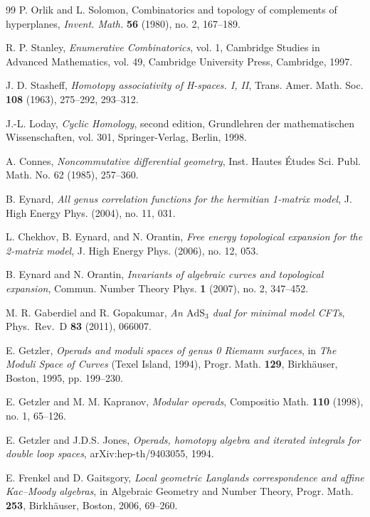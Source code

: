 \begin{thebibliography}{99}
 P. Orlik and L. Solomon, Combinatorics and topology of complements of hyperplanes, \emph{Invent. Math.} \textbf{56} (1980), no. 2, 167--189.
 
 R. P. Stanley, \emph{Enumerative Combinatorics}, vol. 1, Cambridge Studies in Advanced Mathematics, vol. 49, Cambridge University Press, Cambridge, 1997.

 J. D. Stasheff, \emph{Homotopy associativity of H-spaces. I, II}, Trans. Amer. Math. Soc. \textbf{108} (1963), 275--292, 293--312.

J.-L. Loday, \emph{Cyclic Homology}, second edition, Grundlehren der mathematischen Wissenschaften, vol. 301, Springer-Verlag, Berlin, 1998.

A. Connes, \emph{Noncommutative differential geometry}, Inst. Hautes \'Etudes Sci. Publ. Math. No. 62 (1985), 257--360.

 B. Eynard, \emph{All genus correlation functions for the hermitian 1-matrix model}, J. High Energy Phys. (2004), no. 11, 031.

 L. Chekhov, B. Eynard, and N. Orantin, \emph{Free energy topological expansion for the 2-matrix model}, J. High Energy Phys. (2006), no. 12, 053.

 B. Eynard and N. Orantin, \emph{Invariants of algebraic curves and topological expansion}, Commun. Number Theory Phys. \textbf{1} (2007), no. 2, 347--452.

 M. R. Gaberdiel and R. Gopakumar, \emph{An $\mathrm{AdS}_3$ dual for minimal model CFTs}, Phys.\ Rev.\ D \textbf{83} (2011), 066007.

 E. Getzler, \emph{Operads and moduli spaces of genus 0 Riemann surfaces}, in \emph{The Moduli Space of Curves} (Texel Island, 1994), Progr. Math. \textbf{129}, Birkhäuser, Boston, 1995, pp. 199--230.

 E. Getzler and M. M. Kapranov, \emph{Modular operads}, Compositio Math. \textbf{110} (1998), no. 1, 65--126.

 E. Getzler and J.D.S. Jones, \emph{Operads, homotopy algebra and iterated integrals for double loop spaces}, arXiv:hep-th/9403055, 1994.

 E. Frenkel and D. Gaitsgory, \emph{Local geometric Langlands correspondence and affine Kac--Moody algebras}, in Algebraic Geometry and Number Theory, Progr. Math. \textbf{253}, Birkh\"auser, Boston, 2006, 69--260.


\end{thebibliography}
